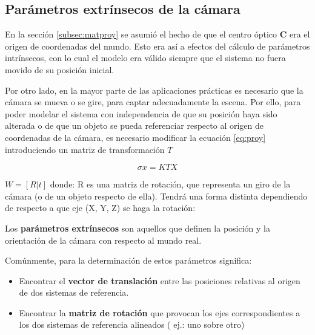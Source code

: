 \subsection{Parámetros extrínsecos de la cámara}
En la sección \ref{subsec:matproy} se asumió el hecho de que el centro óptico \textbf{C} era el origen de coordenadas del mundo. Esto era así a efectos del cálculo de parámetros intrínsecos, con lo cual el modelo era válido siempre que el sistema no fuera movido de su posición inicial.

Por otro lado, en la mayor parte de las aplicaciones prácticas es necesario que la cámara se mueva o se gire, para captar adecuadamente la escena. Por ello, para poder modelar el sistema con independencia de que su posición haya sido alterada o de que un objeto se pueda referenciar respecto al origen de coordenadas de la cámara, es necesario modificar la ecuación \ref{eq:proy} introduciendo un matriz de transformación $T$ 

\begin{equation}
\sigma x = KTX  
\end{equation}

$W = [R|t]$ donde: R es una matriz de rotación, que representa un giro de la cámara (o de un objeto respecto de ella). Tendrá una forma distinta dependiendo de respecto a que eje (X, Y, Z) se haga la rotación:



Los \textbf{parámetros extrínsecos} son aquellos que definen la posición y la orientación de la cámara con respecto al mundo real.

Comúnmente, para la determinación de estos parámetros significa:
\begin{itemize}
\item Encontrar el \textbf{vector de translación} entre las posiciones relativas al origen de dos sistemas de referencia.
\item Encontrar la \textbf{matriz de rotación} que provocan los ejes correspondientes a los dos sistemas de referencia alineados ( ej.: uno sobre otro)
\end{itemize}

